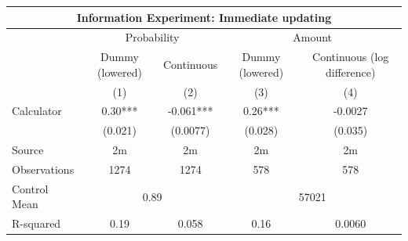 \begin{tabular}{lcccc}
\toprule
\toprule
\multicolumn{5}{c}{\textbf{Information Experiment: Immediate updating}} \\
\midrule
      & \multicolumn{2}{c}{Probability} & \multicolumn{2}{c}{Amount } \\
\midrule
      & Dummy (lowered) & Continuous & Dummy (lowered) & Continuous (log difference) \\
\midrule
      & (1)   & (2)   & (3)   & (4) \\
Calculator & 0.30*** & -0.061*** & 0.26*** & -0.0027 \\
      & (0.021) & (0.0077) & (0.028) & (0.035) \\
\midrule
Source & 2m    & 2m    & 2m    & 2m \\
Observations & 1274  & 1274  & 578   & 578 \\
Control Mean   & \multicolumn{2}{c}{0.89} & \multicolumn{2}{c}{57021 } \\
R-squared & 0.19  & 0.058 & 0.16  & 0.0060 \\
\bottomrule
\bottomrule
\end{tabular}%
